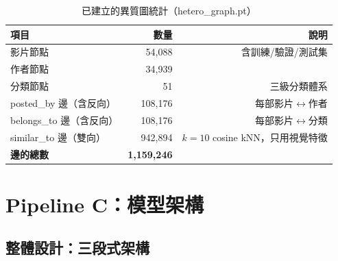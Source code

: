 \documentclass[12pt, a4paper]{article}
\begin{document}
\begin{table}[H]
\centering
\caption{已建立的異質圖統計（hetero\_graph.pt）}
\begin{tabular}{lrr}
\toprule
\textbf{項目} & \textbf{數量} & \textbf{說明} \\
\midrule
影片節點 & 54,088 & 含訓練/驗證/測試集 \\
作者節點 & 34,939 & \\
分類節點 & 51     & 三級分類體系 \\
\midrule
posted\_by 邊（含反向） & 108,176 & 每部影片$\leftrightarrow$作者 \\
belongs\_to 邊（含反向）& 108,176 & 每部影片$\leftrightarrow$分類 \\
similar\_to 邊（雙向）  & 942,894 & $k=10$ cosine kNN，只用視覺特徵 \\
\textbf{邊的總數} & \textbf{1,159,246} & \\
\bottomrule
\end{tabular}
\end{table}

\section{Pipeline C：模型架構}
\label{sec:model}

\subsection{整體設計：三段式架構}
\end{document}
